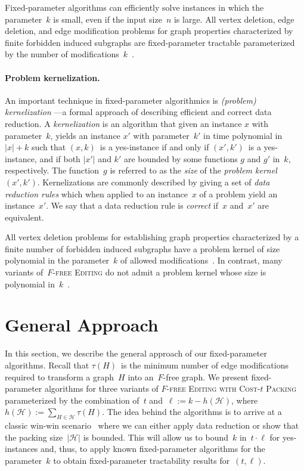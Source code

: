 \documentclass[envcountsame,numbook,smallextended]{svjour3}
\numberwithin{equation}{section}
\numberwithin{figure}{section}
\newcommand{\ffed}{\textsc{$F$-free Editing}}
\newcommand{\tffedv}{\textsc{$F$-free Editing with Cost-$t$ Packing}}
\newcommand{\packing}{\ensuremath{\mathcal H}}
\begin{document}
Fixed-parameter algorithms can efficiently solve instances in which the parameter~$k$ is small, even if the input size~$n$ is large.  All  vertex deletion, edge deletion, and edge modification problems for graph properties characterized by finite forbidden induced subgraphs are fixed-parameter tractable parameterized by the number of modifications~$k$~\cite{Cai96}.

\paragraph{Problem kernelization.} An important technique in
fixed-parameter algorithmics is \emph{(problem) kernelization}
\citep{Kra14}---a formal approach of describing efficient and
correct data reduction.  A \emph{kernelization} is an algorithm
that given an instance $x$ with parameter~$k$, yields an instance $x'$
with parameter~$k'$ in time polynomial in $|x|+k$ such that $(x,k)$~is
a yes-instance if and only if $(x',k')$~is a yes-instance, and if both
$|x'|$ and $k'$ are bounded by some functions $g$ and $g'$ in~$k$,
respectively. The function~$g$ is referred to as the \emph{size} of
the \emph{problem kernel}~$(x',k')$. Kernelizations are commonly
described by giving a set of \emph{data reduction rules} which when
applied to an instance~$x$ of a problem yield an instance~$x'$. We say
that a data reduction rule is \emph{correct} if~$x$ and~$x'$ are equivalent.


All vertex deletion problems for establishing graph properties
characterized by a finite number of forbidden induced subgraphs have a
problem kernel of size polynomial in the parameter~\(k\) of allowed
modifications~\citep{Kra12}.  In contrast, many variants of~\ffed{} do
not admit a problem kernel whose size is polynomial
in~$k$~\cite{KW13,GHPP13,CC15}. 

\section{General Approach}\label{sec:approach}

In this section, we describe the general approach of our
fixed-parameter algorithms. Recall that $\tau(H)$~is the minimum
number of edge modifications required to transform a graph~$H$ into
an~\(F\)-free graph.  We present fixed-parameter algorithms for three
variants of \tffedv{} parameterized by the combination of~$t$
and~$\ell:=k-h(\packing)$,
where~$h(\packing):=\sum_{H\in\packing}\tau(H)$. The idea behind the
algorithms is to arrive at a classic
win-win scenario~\cite{Fell03} where we can either apply data
reduction or show that the packing size~$|\packing|$ is bounded.  This
will allow us to bound~\(k\) in~\(t\cdot \ell\) for yes-instances and,
thus, to apply known fixed-parameter algorithms for the
parameter~\(k\) to obtain fixed-parameter tractability results
for~\((t,\ell)\).
\end{document}
